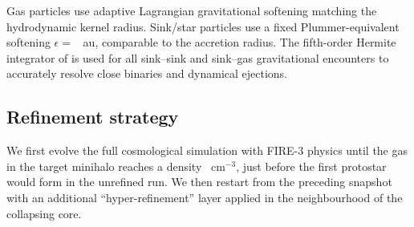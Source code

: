 
Gas particles use adaptive Lagrangian gravitational softening
matching the hydrodynamic kernel radius.
Sink/star particles use a fixed Plummer-equivalent softening
$\epsilon = $ ~au, comparable to the accretion radius.
The fifth-order Hermite integrator of \citet{STARFORGE_Towa_Grudic_2021}
is used for all sink--sink and sink--gas gravitational encounters to
accurately resolve close binaries and dynamical ejections.



\subsection{Refinement strategy}
\label{sec:refinement}

We first evolve the full cosmological simulation with FIRE-3
physics until the gas in the target minihalo reaches a density
~cm$^{-3}$, just before the first protostar
would form in the unrefined run.
We then restart from the preceding snapshot with an additional
``hyper-refinement'' layer applied in the neighbourhood of the
collapsing core.

